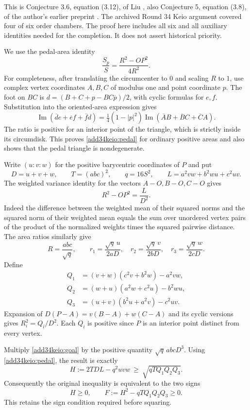 \documentclass[11pt,a4paper]{article}
\numberwithin{equation}{section}
\theoremstyle{definition}
\theoremstyle{remark}
\begin{document}
This is Conjecture 3.6, equation (3.12), of Liu \cite{add34keio:liu}, also
Conjecture 5, equation (3.8), of the author's earlier preprint
\cite{add34keio:preprint}. The archived Round 34 Keio argument covered four of
six order chambers. The proof here includes all six and all auxiliary
identities needed for the completion. It does not assert historical priority.

We use the pedal-area identity
\begin{equation}\label{add34keio:pedal}
 \frac{S_p}{S}=\frac{R^2-OP^2}{4R^2}.
\end{equation}
For completeness, after translating the circumcenter to $0$ and
scaling $R$ to $1$, use complex vertex coordinates $A,B,C$ of modulus
one and point coordinate $p$. The foot on $BC$ is
$d=(B+C+p-BC\overline p)/2$, with cyclic formulas for $e,f$.
Substitution into the oriented-area expression gives
\[
 \operatorname{Im}(\overline d e+\overline e f+\overline f d)
 =\tfrac14(1-|p|^2)
 \operatorname{Im}(\overline A B+\overline B C+\overline C A).
\]
The ratio is positive for an interior point of the triangle, which is
strictly inside its circumdisk. This proves \eqref{add34keio:pedal} for ordinary
positive areas and also shows that the pedal triangle is nondegenerate.

Write $(u:v:w)$ for the positive barycentric coordinates of $P$ and put
\[
 D=u+v+w,\qquad T=(abc)^2,\qquad q=16S^2,
 \qquad L=a^2vw+b^2wu+c^2uv.
\]
The weighted variance identity for the vectors $A-O,B-O,C-O$ gives
\[
 R^2-OP^2=\frac{L}{D^2}.
\]
Indeed the difference between the weighted mean of their squared norms
and the squared norm of their weighted mean equals the sum over
unordered vertex pairs of the product of the normalized weights times
the squared pairwise distance. The area ratios similarly give
\[
 R=\frac{abc}{\sqrt q},\qquad
 r_1=\frac{\sqrt q\,u}{2aD},\quad
 r_2=\frac{\sqrt q\,v}{2bD},\quad
 r_3=\frac{\sqrt q\,w}{2cD}.
\]
Define
\begin{align*}
 Q_1&=(v+w)(c^2v+b^2w)-a^2vw,\\
 Q_2&=(w+u)(a^2w+c^2u)-b^2wu,\\
 Q_3&=(u+v)(b^2u+a^2v)-c^2uv.
\end{align*}
Expansion of $D(P-A)=v(B-A)+w(C-A)$ and its cyclic versions gives
$R_i^2=Q_i/D^2$. Each $Q_i$ is positive since $P$ is an interior
point distinct from every vertex.

Multiply \eqref{add34keio:goal} by the positive quantity $\sqrt q\,abcD^3$.
Using \eqref{add34keio:pedal}, the result is exactly
\[
 H:=2TDL-q^2uvw\ \ge\ \sqrt{qTQ_1Q_2Q_3}.
\]
Consequently the original inequality is equivalent to the two signs
\begin{equation}\label{add34keio:signs}
 H\ge0,\qquad F:=H^2-qTQ_1Q_2Q_3\ge0.
\end{equation}
This retains the sign condition required before squaring.
\end{document}
